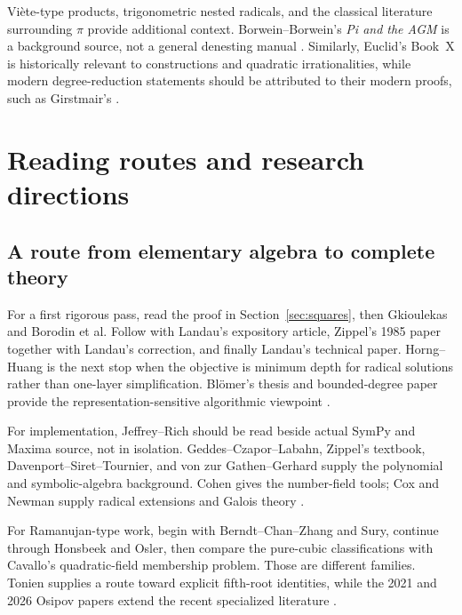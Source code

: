 \documentclass[11pt,a4paper]{article}
\numberwithin{equation}{section}
\theoremstyle{definition}\newtheorem{definition}[theorem]{Definition}
\theoremstyle{remark}\newtheorem{remark}[theorem]{Remark}
\begin{document}
Vi\`ete-type products, trigonometric nested radicals, and the classical literature surrounding $\pi$ provide additional context. Borwein--Borwein's \emph{Pi and the AGM} is a background source, not a general denesting manual \cite{piagm}. Similarly, Euclid's Book~X is historically relevant to constructions and quadratic irrationalities, while modern degree-reduction statements should be attributed to their modern proofs, such as Girstmair's \cite{euclid,girstmair}.

\section{Reading routes and research directions}
\label{sec:routes}

\subsection{A route from elementary algebra to complete theory}
For a first rigorous pass, read the proof in Section~\ref{sec:squares}, then Gkioulekas and Borodin et al. Follow with Landau's expository article, Zippel's 1985 paper together with Landau's correction, and finally Landau's technical paper. Horng--Huang is the next stop when the objective is minimum depth for radical solutions rather than one-layer simplification. Bl\"omer's thesis and bounded-degree paper provide the representation-sensitive algorithmic viewpoint \cite{gkioulekas,bfht,landau94,zippel85,landauNote,landau92,horng99,bloemer93,bloemer00}.

For implementation, Jeffrey--Rich should be read beside actual SymPy and Maxima source, not in isolation. Geddes--Czapor--Labahn, Zippel's textbook, Davenport--Siret--Tournier, and von zur Gathen--Gerhard supply the polynomial and symbolic-algebra background. Cohen gives the number-field tools; Cox and Newman supply radical extensions and Galois theory \cite{jeffrey,sympysrc,raddenestsrc,geddes,zippelbook,davenport,gathen,cohen,cox,newman}.

For Ramanujan-type work, begin with Berndt--Chan--Zhang and Sury, continue through Honsbeek and Osler, then compare the pure-cubic classifications with Cavallo's quadratic-field membership problem. Those are different families. Tonien supplies a route toward explicit fifth-root identities, while the 2021 and 2026 Osipov papers extend the recent specialized literature \cite{berndt97,berndt98,sury,honsbeek05,osler,antipov,cavallo,tonien,osipov21,osipov26}.
\end{document}
